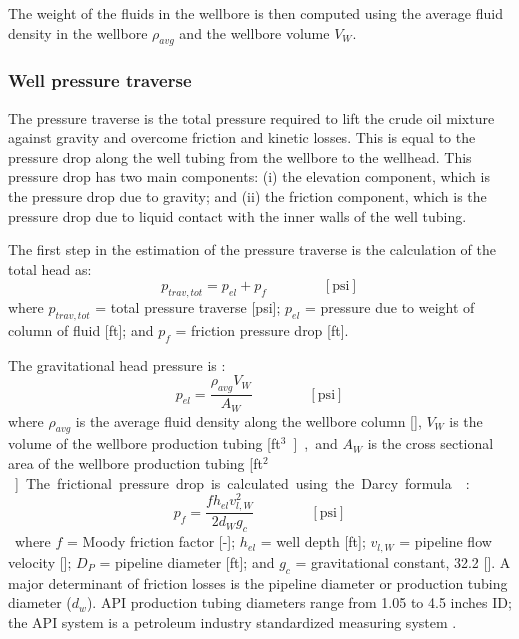 \documentclass[11pt]{report}
\newcommand{\eqnunit}[1]{\quad\quad \scriptstyle{\left[\text{#1}\right]}}
\begin{document}
The weight of the fluids in the wellbore is then computed using the average fluid density in the wellbore $\rho_{avg}$ and the wellbore volume $V_W$.

\subsubsection{Well pressure traverse}

The pressure traverse is the total pressure required to lift the crude oil mixture against gravity and overcome friction and kinetic losses. This is equal to the pressure drop along the well tubing from the wellbore to the wellhead. This pressure drop has two main components: (i) the elevation component, which is the pressure drop due to gravity; and (ii) the friction component, which is the pressure drop due to liquid contact with the inner walls of the well tubing.


The first step in the estimation of the pressure traverse is the calculation of the total head as: 
\begin{equation} \label{eq:total_head}
p_{trav,tot}= p_{el} + p_{f} \quad\quad\eqnunit{psi}
\end{equation}
where $p_{trav,tot}$ = total pressure traverse [\unit{psi}]; $p_{el}$ = pressure due to weight of column of fluid [\unit{ft}]; and $p_{f}$ = friction pressure drop [\unit{ft}]. 

The gravitational head pressure is \cite[Table 1, p. 455]{Mcallister2009}:
\begin{equation} \label{eq:pressure_traverse}
p_{el} = \frac{\rho_{avg} V_{W}}{A_W}  \quad\quad\eqnunit{psi}
\end{equation}
where $\rho_{avg}$ is the average fluid density along the wellbore column [], $V_{W}$ is the volume of the wellbore production tubing [\unit{ft$^3$}], and $A_W$ is the cross sectional area of the wellbore production tubing [\unit{ft$^2$}].

The frictional pressure drop is calculated using the Darcy formula \cite[p. 447]{Mcallister2009}:
\begin{equation} \label{eq:friction_head}
p_{f}=\frac{fh_{el}{v_{l,W}^2}}{2d_{W}{g_{c}}} \quad\quad\eqnunit{psi}
\end{equation}
where $f$ = Moody friction factor [-]; $h_{el}$ = well depth [\unit{ft}]; $v_{l,W}$ = pipeline flow velocity []; $D_{P}$ = pipeline diameter [\unit{ft}]; and $g_{c}$ = gravitational constant, 32.2 []. A major determinant of friction losses is the pipeline diameter or production tubing diameter ($d_{w}$). API production tubing diameters range from 1.05 to 4.5 inches ID; the API system is a petroleum industry standardized measuring system \cite[p. 106]{Clegg2007}.
\end{document}
